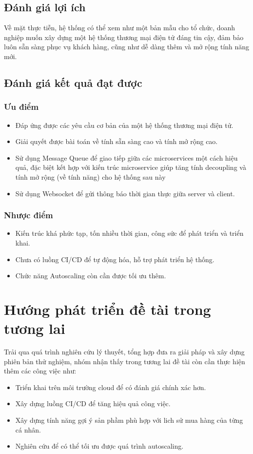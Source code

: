\subsection{Đánh giá lợi ích}
\noindent Về mặt thực tiễn, hệ thống có thể xem như một bản mẫu cho tổ chức, doanh nghiệp muốn xây dựng một hệ 
thống thương mại điện tử đáng tin cậy, đảm bảo luôn sẵn sàng phục vụ khách hàng, cũng như dễ dàng thêm và mở 
rộng tính năng mới.
\subsection{Đánh giá kết quả đạt được}
\subsubsection{Ưu điểm}
\begin{itemize}
    \item Đáp ứng được các yêu cầu cơ bản của một hệ thống thương mại điện tử.
    \item Giải quyết được bài toán về tính sẵn sàng cao và tính mở rộng cao.
    \item Sử dụng Message Queue để giao tiếp giữa các microservices một cách hiệu quả, đặc biệt kết hợp với kiến trúc microservice giúp tăng tính decoupling và tính mở rộng (về tính năng) cho hệ thống sau này
    \item Sử dụng Websocket để gửi thông báo thời gian thực giữa server và client.
\end{itemize}
\subsubsection{Nhược điểm}
\begin{itemize}
    \item Kiến trúc khá phức tạp, tốn nhiều thời gian, công sức để phát triển và triển khai.
    \item Chưa có luồng CI/CD để tự động hóa, hỗ trợ phát triển hệ thống.
    \item Chức năng Autoscaling còn cần được tối ưu thêm.
\end{itemize}
\section{Hướng phát triển đề tài trong tương lai}
\noindent Trải qua quá trình nghiên cứu lý thuyết, tổng hợp đưa ra giải pháp và xây dựng phiên bản thử nghiệm, nhóm nhận thấy trong tương lai đề tài còn cần thực hiện thêm các công việc như:
\begin{itemize}
    \item Triển khai trên môi trường cloud để có đánh giá chính xác hơn.
    \item Xây dựng luồng CI/CD để tăng hiệu quả công việc.
    \item Xây dựng tính năng gợi ý sản phầm phù hợp với lich sử mua hàng của từng cá nhân.
    \item Nghiên cứu để có thể tối ưu được quá trình autoscaling.
\end{itemize}

